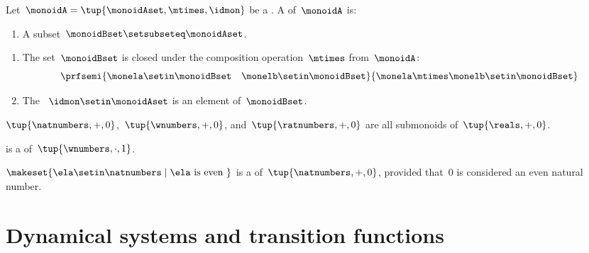 \begin{definition}[Submonoids]\label{def:submonoids}
    Let~$\monoidA = \tup{\monoidAset, \mtimes, \idmon}$ be a .
    A  of~$\monoidA$ is:

    \constit

    \begin{enumerate}
        \item A subset~$\monoidBset \setsubseteq \monoidAset$.
    \end{enumerate}

    \condit

    \begin{enumerate}
        \item The set~$\monoidBset$ is closed under the composition operation~$\mtimes$ from~$\monoidA$:
              \begin{equation}
                  \prfsemi{\monela \setin \monoidBset \quad \monelb \setin \monoidBset}{\monela \mtimes \monelb \setin \monoidBset}
              \end{equation}

        \item The ~$\idmon \setin \monoidAset$ is an element of~$\monoidBset$.
    \end{enumerate}
\end{definition}

\begin{example}
    $\tup{\natnumbers, +,0}$,~$\tup{\wnumbers, {{+}}, 0}$, and~$\tup{\ratnumbers, {{+}}, 0}$ are all submonoids of~$\tup{\reals, {{+}}, 0}$.
\end{example}

\begin{example}
    \natnumbers  is a  of~$\tup{\wnumbers, {{\cdot}}, 1}$.
\end{example}

\begin{example}
    $\makeset{ \ela \setin \natnumbers \mid \ela \text{ is even } }$ is a  of~$\tup{\natnumbers, {{+}}, 0}$, provided that~$0$ is considered an even natural number.
\end{example}

\section[Dynamical systems]{Dynamical systems and transition functions}


